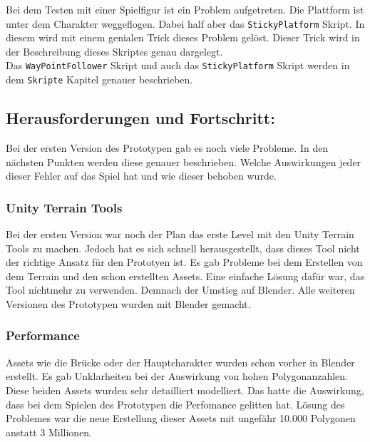Bei dem Testen mit einer Spielfigur ist ein Problem aufgetreten. Die Plattform ist unter dem Charakter weggeflogen. Dabei half aber das \verb+StickyPlatform+ Skript. In diesem wird mit einem genialen Trick dieses Problem gelöst. Dieser Trick wird in der Beschreibung dieses Skriptes genau dargelegt.\\

Das \verb+WayPointFollower+ Skript und auch das \verb+StickyPlatform+ Skript werden in dem \verb+Skripte+ Kapitel genauer beschrieben. 

\pagebreak


\subsection{Herausforderungen und Fortschritt:}

Bei der ersten Version des Prototypen gab es noch viele Probleme. In den nächsten Punkten werden diese genauer beschrieben. Welche Auswirkungen jeder dieser Fehler auf das Spiel hat und wie dieser behoben wurde.

\subsubsection{Unity Terrain Tools}
Bei der ersten Version war noch der Plan das erste Level mit den Unity Terrain Tools zu machen. Jedoch hat es sich schnell herausgestellt, dass dieses Tool nicht der richtige Ansatz für den Prototyen ist. Es gab Probleme bei dem Erstellen von dem Terrain und den schon erstellten Assets. Eine einfache Lösung dafür war, das Tool nichtmehr zu verwenden. Demnach der Umstieg auf Blender. Alle weiteren Versionen des Prototypen wurden mit Blender gemacht.

\subsubsection{Performance}
Assets wie die Brücke oder der Hauptcharakter wurden schon vorher in Blender erstellt. Es gab Unklarheiten bei der Auswirkung von hohen Polygonanzahlen. Diese beiden Assets wurden sehr detailliert modelliert. Das hatte die Auswirkung, dass bei dem Spielen des Prototypen die Perfomance gelitten hat. Lösung des Problemes war die neue Erstellung dieser Assets mit ungefähr 10.000 Polygonen anstatt 3 Millionen.

